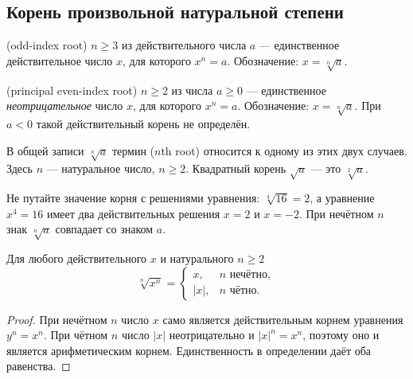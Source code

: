 \subsection{Корень произвольной натуральной степени}
\begin{definition}
 (odd-index root) \(n\geq 3\) из действительного числа \(a\) — единственное действительное число \(x\), для которого \(x^n=a\). Обозначение: \(x=\sqrt[n]{a}\).
\end{definition}
\begin{definition}
 (principal even-index root) \(n\geq2\) из числа \(a\geq0\) — единственное \emph{неотрицательное} число \(x\), для которого \(x^n=a\). Обозначение: \(x=\sqrt[n]{a}\). При \(a<0\) такой действительный корень не определён.
\end{definition}
В общей записи \(\sqrt[n]{a}\) термин  (\(n\)th root) относится к одному из этих двух случаев. Здесь \(n\) — натуральное число, \(n\geq2\). Квадратный корень \(\sqrt a\) — это \(\sqrt[2]a\).

Не путайте значение корня с решениями уравнения: \(\sqrt[4]{16}=2\), а уравнение \(x^4=16\) имеет два действительных решения \(x=2\) и \(x=-2\). При нечётном \(n\) знак \(\sqrt[n]a\) совпадает со знаком \(a\).

\begin{theorem}\label{thm:legacy-c07-2}
Для любого действительного \(x\) и натурального \(n\geq2\)
\[
\sqrt[n]{x^n}=
\begin{cases}
 x,&n\text{ нечётно},\\
 |x|,&n\text{ чётно}.
\end{cases}
\]
\end{theorem}
\begin{proof}
При нечётном \(n\) число \(x\) само является действительным корнем уравнения \(y^n=x^n\). При чётном \(n\) число \(|x|\) неотрицательно и \(|x|^n=x^n\), поэтому оно и является арифметическим корнем. Единственность в определении даёт оба равенства.
\end{proof}

